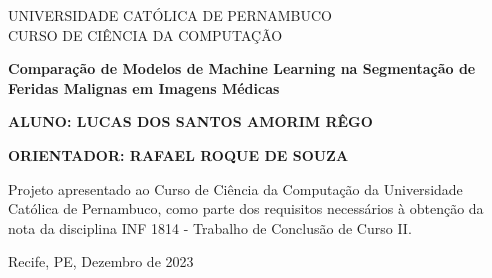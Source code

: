 %
%

\begin{titlepage}

\begin{center}
\small


\begin{center}
\textsf{\textsc{UNIVERSIDADE CATÓLICA DE PERNAMBUCO \\
CURSO DE CIÊNCIA DA COMPUTAÇÃO}}
\end{center}




\vfill

\LARGE
\begin{center}
\textbf{  
} \textbf{Comparação de Modelos de Machine Learning na Segmentação de Feridas Malignas em Imagens Médicas}
\end{center}

\vfill

\Large



\vfill

\normalsize
\hfill
\parbox{0.70\linewidth}{\textbf{ALUNO: LUCAS DOS SANTOS AMORIM RÊGO} 

\textbf{ORIENTADOR: RAFAEL ROQUE DE SOUZA} 
}


\vfill

\hfill
\parbox{0.70\linewidth}{
Projeto apresentado ao Curso de Ciência
da Computação da Universidade Católica
de Pernambuco, como parte dos
requisitos necessários à obtenção da
nota da disciplina INF 1814 - Trabalho de
Conclusão de Curso II.
}



\vfill

\large

\begin{center}
Recife, PE, Dezembro de 2023
\end{center}

\end{center}

\end{titlepage}
